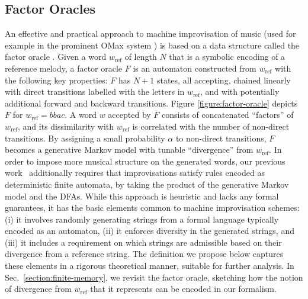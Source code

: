\documentclass[a4paper,USenglish,numberwithinsect]{lipics}
\theoremstyle{plain}
\theoremstyle{definition}
\newcommand{\wref}{w_{\text{ref}}}
\begin{document}
\subsection{Factor Oracles}

An effective and practical approach to machine improvisation of music (used for example in the prominent OMax system \cite{omax}) is based on a data structure
called the factor oracle \cite{AssayagD04,Cleophas03constructingfactor}. Given a word
$\wref$ of length $N$ that is a symbolic encoding of a reference melody, a factor oracle $F$ is an
automaton constructed from $\wref$ with the following key properties: $F$ has $N+1$ states, all
accepting, chained linearly with direct transitions labelled with the letters in $\wref$, and with
potentially additional forward and backward transitions. Figure \ref{figure:factor-oracle} depicts
$F$ for $\wref = bbac$.  A word $w$ accepted by $F$ consists of concatenated ``factors'' of $\wref$,
and its dissimilarity with $\wref$ is correlated with the number of non-direct transitions. By
assigning a small probability $\alpha$ to non-direct transitions, $F$ becomes a generative Markov
model with tunable ``divergence'' from $\wref$. In order to impose more musical structure on the
generated words, our previous work~\cite{donze-icmc14} additionally requires that improvisations
satisfy rules encoded as deterministic finite automata, by taking the product of the generative
Markov model and the DFAs. While this approach is heuristic and lacks any formal guarantees, it has
the basic elements common to machine improvisation schemes: (i) it involves randomly generating
strings from a formal language typically encoded as an automaton, (ii) it enforces diversity in the
generated strings, and (iii) it includes a requirement on which strings are admissible based on their
divergence from a reference string. The definition we propose below captures these elements in a
rigorous theoretical manner, suitable for further analysis.  In Sec.~\ref{section:finite-memory}, we
revisit the factor oracle, sketching how the notion of divergence from $\wref$ that it represents can be
encoded in our formalism.
 
\end{document}
